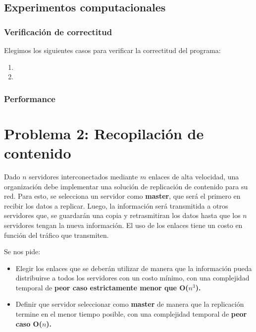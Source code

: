 \documentclass[a4paper, 10pt, twoside]{article}
\begin{document}
\subsection{Experimentos computacionales}
\subsubsection{Verificación de correctitud}

Elegimos los siguientes casos para verificar la correctitud del programa:

\begin{enumerate}
\item{}
\item{}
\end{enumerate}


\subsubsection{Performance}








\newpage

\section{Problema 2: Recopilación de contenido}

Dado $n$ servidores interconectados mediante $m$ enlaces de alta velocidad, una organización debe implementar una solución de replicación de contenido para su red. Para esto, se selecciona un servidor como \textbf{master}, que será el primero en recibir los datos a replicar. Luego, la información será transmitida a otros servidores que, se guardarán una copia y retrasmitiran los datos hasta que los $n$ servidores tengan la nueva información. El uso de los enlaces tiene un costo en función del tráfico que transmiten.

Se nos pide:
\begin{itemize}
    \item{Elegir los enlaces que se deberán utilizar de manera que la información pueda distribuirse a todos los servidores con un costo mínimo, con una complejidad temporal de \textbf{peor caso estrictamente menor que O($n^3$).}}
    \item{Definir que servidor seleccionar como \textbf{master} de manera que la replicación termine en el menor tiempo posible, con una complejidad temporal de \textbf{peor caso O($n$).}}
\end{itemize}
\end{document}
